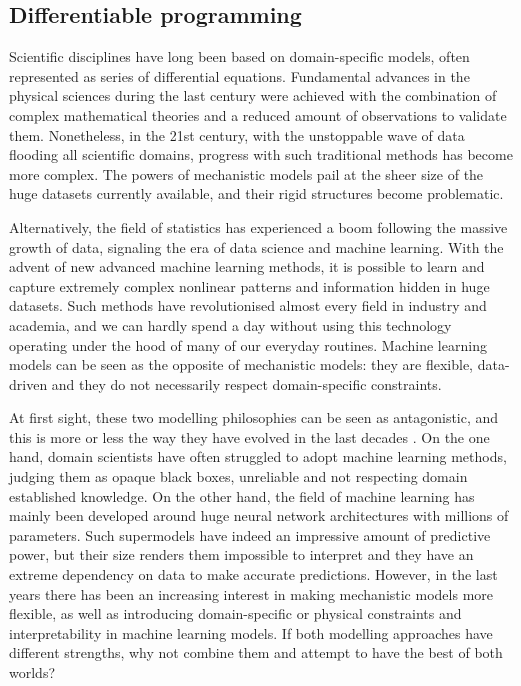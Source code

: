\subsection{Differentiable programming}

Scientific disciplines have long been based on domain-specific models, often represented as series of differential equations. 
Fundamental advances in the physical sciences during the last century were achieved with the combination of complex mathematical theories and a reduced amount of observations to validate them. 
Nonetheless, in the 21st century, with the unstoppable wave of data flooding all scientific domains, progress with such traditional methods has become more complex. 
The powers of mechanistic models pail at the sheer size of the huge datasets currently available, and their rigid structures become problematic. 

Alternatively, the field of statistics has experienced a boom following the massive growth of data, signaling the era of data science and machine learning. 
With the advent of new advanced machine learning methods, it is possible to learn and capture extremely complex nonlinear patterns and information hidden in huge datasets. 
Such methods have revolutionised almost every field in industry and academia, and we can hardly spend a day without using this technology operating under the hood of many of our everyday routines. 
Machine learning models can be seen as the opposite of mechanistic models: they are flexible, data-driven and they do not necessarily respect domain-specific constraints.

At first sight, these two modelling philosophies can be seen as antagonistic, and this is more or less the way they have evolved in the last decades \cite{zdeborova_understanding_2020}. 
On the one hand, domain scientists have often struggled to adopt machine learning methods, judging them as opaque black boxes, unreliable and not respecting domain established knowledge. 
On the other hand, the field of machine learning has mainly been developed around huge neural network architectures with millions of parameters. 
Such supermodels have indeed an impressive amount of predictive power, but their size renders them impossible to interpret and they have an extreme dependency on data to make accurate predictions. 
However, in the last years there has been an increasing interest in making mechanistic models more flexible, as well as introducing domain-specific or physical constraints and interpretability in machine learning models. 
If both modelling approaches have different strengths, why not combine them and attempt to have the best of both worlds?

